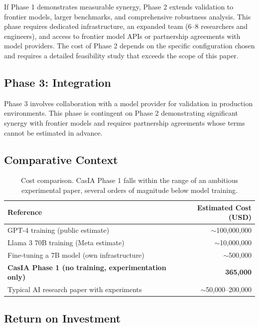 \documentclass[11pt,a4paper]{article}
\theoremstyle{remark}
\begin{document}
If Phase 1 demonstrates measurable synergy, Phase 2 extends validation to frontier models, larger benchmarks, and comprehensive robustness analysis. This phase requires dedicated infrastructure, an expanded team (6--8 researchers and engineers), and access to frontier model APIs or partnership agreements with model providers. The cost of Phase 2 depends on the specific configuration chosen and requires a detailed feasibility study that exceeds the scope of this paper.

\subsection{Phase 3: Integration}

Phase 3 involves collaboration with a model provider for validation in production environments. This phase is contingent on Phase 2 demonstrating significant synergy with frontier models and requires partnership agreements whose terms cannot be estimated in advance.

\subsection{Comparative Context}

\begin{table}[H]
\centering
\begin{tabular}{@{}lr@{}}
\toprule
\textbf{Reference} & \textbf{Estimated Cost (USD)} \\
\midrule
GPT-4 training (public estimate) & $\sim$100,000,000 \\
Llama 3 70B training (Meta estimate) & $\sim$10,000,000 \\
Fine-tuning a 7B model (own infrastructure) & $\sim$500,000 \\
\textbf{CasIA Phase 1 (no training, experimentation only)} & \textbf{365,000} \\
Typical AI research paper with experiments & $\sim$50,000--200,000 \\
\bottomrule
\end{tabular}
\caption{Cost comparison. CasIA Phase 1 falls within the range of an ambitious experimental paper, several orders of magnitude below model training.}
\label{tab:comparison}
\end{table}

\subsection{Return on Investment}
\end{document}
